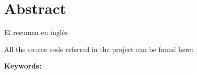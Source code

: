 \chapter*{Abstract}
El resumen en inglés

All the source code referred in the project can be found here: 

\vspace{10mm}

\textbf{Keywords: }